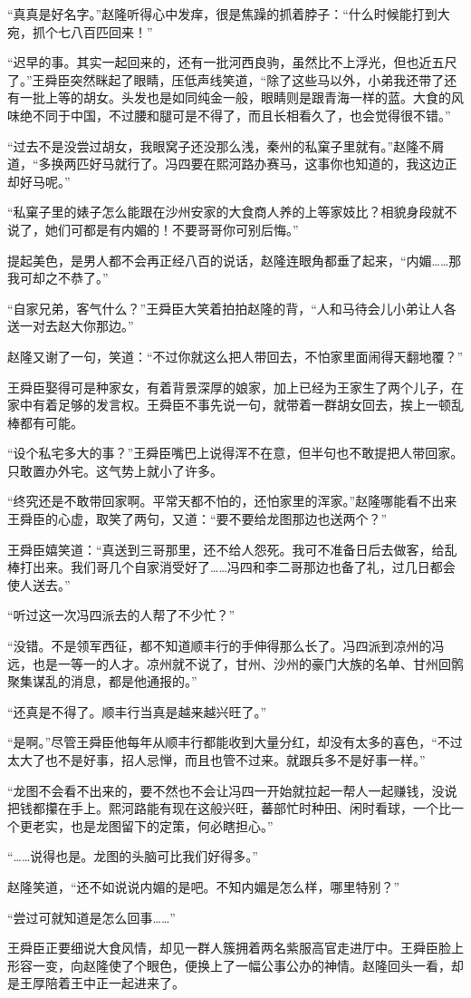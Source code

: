 “真真是好名字。”赵隆听得心中发痒，很是焦躁的抓着脖子：“什么时候能打到大宛，抓个七八百匹回来！”

“迟早的事。其实一起回来的，还有一批河西良驹，虽然比不上浮光，但也近五尺了。”王舜臣突然眯起了眼睛，压低声线笑道，“除了这些马以外，小弟我还带了还有一批上等的胡女。头发也是如同纯金一般，眼睛则是跟青海一样的蓝。大食的风味绝不同于中国，不过腰和腿可是不得了，而且长相看久了，也会觉得很不错。”

“过去不是没尝过胡女，我眼窝子还没那么浅，秦州的私窠子里就有。”赵隆不屑道，“多换两匹好马就行了。冯四要在熙河路办赛马，这事你也知道的，我这边正却好马呢。”

“私窠子里的婊子怎么能跟在沙州安家的大食商人养的上等家妓比？相貌身段就不说了，她们可都是有内媚的！不要哥哥你可别后悔。”

提起美色，是男人都不会再正经八百的说话，赵隆连眼角都垂了起来，“内媚……那我可却之不恭了。”

“自家兄弟，客气什么？”王舜臣大笑着拍拍赵隆的背，“人和马待会儿小弟让人各送一对去赵大你那边。”

赵隆又谢了一句，笑道：“不过你就这么把人带回去，不怕家里面闹得天翻地覆？”

王舜臣娶得可是种家女，有着背景深厚的娘家，加上已经为王家生了两个儿子，在家中有着足够的发言权。王舜臣不事先说一句，就带着一群胡女回去，挨上一顿乱棒都有可能。

“设个私宅多大的事？”王舜臣嘴巴上说得浑不在意，但半句也不敢提把人带回家。只敢置办外宅。这气势上就小了许多。

“终究还是不敢带回家啊。平常天都不怕的，还怕家里的浑家。”赵隆哪能看不出来王舜臣的心虚，取笑了两句，又道：“要不要给龙图那边也送两个？”

王舜臣嬉笑道：“真送到三哥那里，还不给人怨死。我可不准备日后去做客，给乱棒打出来。我们哥几个自家消受好了……冯四和李二哥那边也备了礼，过几日都会使人送去。”

“听过这一次冯四派去的人帮了不少忙？”

“没错。不是领军西征，都不知道顺丰行的手伸得那么长了。冯四派到凉州的冯远，也是一等一的人才。凉州就不说了，甘州、沙州的豪门大族的名单、甘州回鹘聚集谋乱的消息，都是他通报的。”

“还真是不得了。顺丰行当真是越来越兴旺了。”

“是啊。”尽管王舜臣他每年从顺丰行都能收到大量分红，却没有太多的喜色，“不过太大了也不是好事，招人忌惮，而且也管不过来。就跟兵多不是好事一样。”

“龙图不会看不出来的，要不然也不会让冯四一开始就拉起一帮人一起赚钱，没说把钱都攥在手上。熙河路能有现在这般兴旺，蕃部忙时种田、闲时看球，一个比一个更老实，也是龙图留下的定策，何必瞎担心。”

“……说得也是。龙图的头脑可比我们好得多。”

赵隆笑道，“还不如说说内媚的是吧。不知内媚是怎么样，哪里特别？”

“尝过可就知道是怎么回事……”

王舜臣正要细说大食风情，却见一群人簇拥着两名紫服高官走进厅中。王舜臣脸上形容一变，向赵隆使了个眼色，便换上了一幅公事公办的神情。赵隆回头一看，却是王厚陪着王中正一起进来了。


